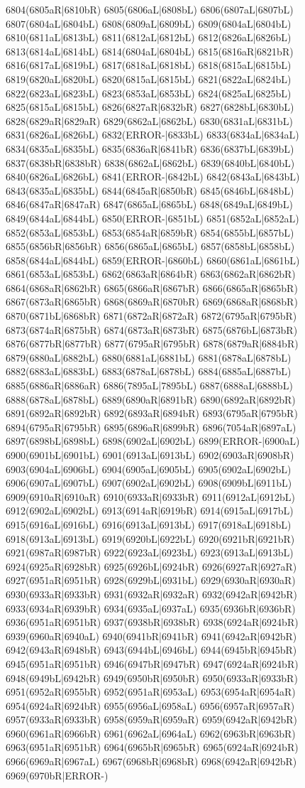 6804(6805aR|6810bR) 6805(6806aL|6808bL) 6806(6807aL|6807bL) 6807(6804aL|6804bL) 6808(6809aL|6809bL) 6809(6804aL|6804bL) 6810(6811aL|6813bL) 6811(6812aL|6812bL) 6812(6826aL|6826bL) 6813(6814aL|6814bL) 6814(6804aL|6804bL) 6815(6816aR|6821bR) 6816(6817aL|6819bL) 6817(6818aL|6818bL) 6818(6815aL|6815bL) 6819(6820aL|6820bL) 6820(6815aL|6815bL) 6821(6822aL|6824bL) 6822(6823aL|6823bL) 6823(6853aL|6853bL) 6824(6825aL|6825bL) 6825(6815aL|6815bL) 6826(6827aR|6832bR) 6827(6828bL|6830bL) 6828(6829aR|6829aR) 6829(6862aL|6862bL) 6830(6831aL|6831bL) 6831(6826aL|6826bL) 6832(ERROR-|6833bL) 6833(6834aL|6834aL) 6834(6835aL|6835bL) 6835(6836aR|6841bR) 6836(6837bL|6839bL) 6837(6838bR|6838bR) 6838(6862aL|6862bL) 6839(6840bL|6840bL) 6840(6826aL|6826bL) 6841(ERROR-|6842bL) 6842(6843aL|6843bL) 6843(6835aL|6835bL) 6844(6845aR|6850bR) 6845(6846bL|6848bL) 6846(6847aR|6847aR) 6847(6865aL|6865bL) 6848(6849aL|6849bL) 6849(6844aL|6844bL) 6850(ERROR-|6851bL) 6851(6852aL|6852aL) 6852(6853aL|6853bL) 6853(6854aR|6859bR) 6854(6855bL|6857bL) 6855(6856bR|6856bR) 6856(6865aL|6865bL) 6857(6858bL|6858bL) 6858(6844aL|6844bL) 6859(ERROR-|6860bL) 6860(6861aL|6861bL) 6861(6853aL|6853bL) 6862(6863aR|6864bR) 6863(6862aR|6862bR) 6864(6868aR|6862bR) 6865(6866aR|6867bR) 6866(6865aR|6865bR) 6867(6873aR|6865bR) 6868(6869aR|6870bR) 6869(6868aR|6868bR) 6870(6871bL|6868bR) 6871(6872aR|6872aR) 6872(6795aR|6795bR) 6873(6874aR|6875bR) 6874(6873aR|6873bR) 6875(6876bL|6873bR) 6876(6877bR|6877bR) 6877(6795aR|6795bR) 6878(6879aR|6884bR) 6879(6880aL|6882bL) 6880(6881aL|6881bL) 6881(6878aL|6878bL) 6882(6883aL|6883bL) 6883(6878aL|6878bL) 6884(6885aL|6887bL) 6885(6886aR|6886aR) 6886(7895aL|7895bL) 6887(6888aL|6888bL) 6888(6878aL|6878bL) 6889(6890aR|6891bR) 6890(6892aR|6892bR) 6891(6892aR|6892bR) 6892(6893aR|6894bR) 6893(6795aR|6795bR) 6894(6795aR|6795bR) 6895(6896aR|6899bR) 6896(7054aR|6897aL) 6897(6898bL|6898bL) 6898(6902aL|6902bL) 6899(ERROR-|6900aL) 6900(6901bL|6901bL) 6901(6913aL|6913bL) 6902(6903aR|6908bR) 6903(6904aL|6906bL) 6904(6905aL|6905bL) 6905(6902aL|6902bL) 6906(6907aL|6907bL) 6907(6902aL|6902bL) 6908(6909bL|6911bL) 6909(6910aR|6910aR) 6910(6933aR|6933bR) 6911(6912aL|6912bL) 6912(6902aL|6902bL) 6913(6914aR|6919bR) 6914(6915aL|6917bL) 6915(6916aL|6916bL) 6916(6913aL|6913bL) 6917(6918aL|6918bL) 6918(6913aL|6913bL) 6919(6920bL|6922bL) 6920(6921bR|6921bR) 6921(6987aR|6987bR) 6922(6923aL|6923bL) 6923(6913aL|6913bL) 6924(6925aR|6928bR) 6925(6926bL|6924bR) 6926(6927aR|6927aR) 6927(6951aR|6951bR) 6928(6929bL|6931bL) 6929(6930aR|6930aR) 6930(6933aR|6933bR) 6931(6932aR|6932aR) 6932(6942aR|6942bR) 6933(6934aR|6939bR) 6934(6935aL|6937aL) 6935(6936bR|6936bR) 6936(6951aR|6951bR) 6937(6938bR|6938bR) 6938(6924aR|6924bR) 6939(6960aR|6940aL) 6940(6941bR|6941bR) 6941(6942aR|6942bR) 6942(6943aR|6948bR) 6943(6944bL|6946bL) 6944(6945bR|6945bR) 6945(6951aR|6951bR) 6946(6947bR|6947bR) 6947(6924aR|6924bR) 6948(6949bL|6942bR) 6949(6950bR|6950bR) 6950(6933aR|6933bR) 6951(6952aR|6955bR) 6952(6951aR|6953aL) 6953(6954aR|6954aR) 6954(6924aR|6924bR) 6955(6956aL|6958aL) 6956(6957aR|6957aR) 6957(6933aR|6933bR) 6958(6959aR|6959aR) 6959(6942aR|6942bR) 6960(6961aR|6966bR) 6961(6962aL|6964aL) 6962(6963bR|6963bR) 6963(6951aR|6951bR) 6964(6965bR|6965bR) 6965(6924aR|6924bR) 6966(6969aR|6967aL) 6967(6968bR|6968bR) 6968(6942aR|6942bR) 6969(6970bR|ERROR-) 
